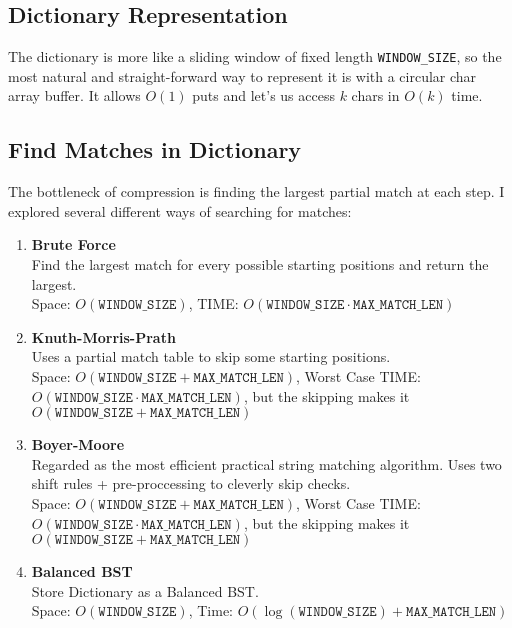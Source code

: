 \documentclass[a4paper]{article}
\begin{document}
\subsection{Dictionary Representation}
The dictionary is more like a sliding window of fixed length \texttt{WINDOW\_SIZE}, so the most natural and straight-forward way to represent it is with a circular char array buffer. It allows \(O(1)\) puts and let's us access \(k\) chars in \(O(k)\) time. 
\subsection{Find Matches in Dictionary}
The bottleneck of compression is finding the largest partial match at each step.
I explored several different ways of searching for matches:

\begin{enumerate}
\item \textbf{Brute Force}\\
Find the largest match for every possible starting positions and return the largest.\\
Space: \(O(\texttt{WINDOW\_SIZE})\), TIME: \(O(\texttt{WINDOW\_SIZE} \cdot \texttt{MAX\_MATCH\_LEN})\)

\item \textbf{Knuth-Morris-Prath}\\
Uses a partial match table to skip some starting positions.\\
Space: \(O(\texttt{WINDOW\_SIZE} + \texttt{MAX\_MATCH\_LEN})\), Worst Case TIME: \(O(\texttt{WINDOW\_SIZE} \cdot \texttt{MAX\_MATCH\_LEN})\), but the skipping makes it \(O(\texttt{WINDOW\_SIZE} + \texttt{MAX\_MATCH\_LEN})\)

\item \textbf{Boyer-Moore}\\
Regarded as the most efficient practical string matching algorithm. Uses two shift rules + pre-proccessing to cleverly skip checks.\\
Space: \(O(\texttt{WINDOW\_SIZE} + \texttt{MAX\_MATCH\_LEN})\), Worst Case TIME: \(O(\texttt{WINDOW\_SIZE} \cdot \texttt{MAX\_MATCH\_LEN})\), but the skipping makes it \(O(\texttt{WINDOW\_SIZE} + \texttt{MAX\_MATCH\_LEN})\)

\item \textbf{Balanced BST}\\
Store Dictionary as a Balanced BST.\\
Space: \(O(\texttt{WINDOW\_SIZE})\), Time: \(O(\log(\texttt{WINDOW\_SIZE}) + \texttt{MAX\_MATCH\_LEN})\)
\end{enumerate}
\end{document}
